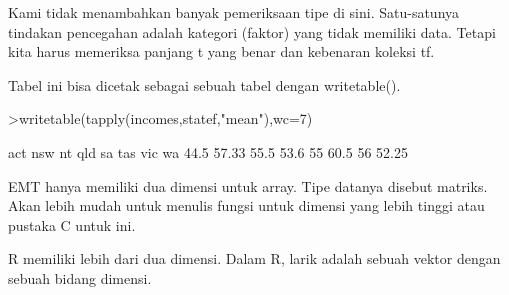 \documentclass[a4paper,10pt]{article}
\begin{document}
\begin{eulernotebook}
\begin{eulercomment}
\begin{eulercomment}
\begin{eulercomment}
\begin{eulercomment}
\begin{eulercomment}
\begin{eulercomment}
\begin{eulercomment}
\begin{eulercomment}
\begin{eulercomment}
\begin{eulercomment}
\begin{eulercomment}
\begin{eulercomment}
\begin{eulercomment}
\begin{eulercomment}
\begin{eulercomment}
\begin{eulercomment}
\begin{eulercomment}
\begin{eulercomment}
\begin{eulercomment}
\begin{eulercomment}
\begin{eulercomment}
\begin{eulercomment}
\begin{eulercomment}
Kami tidak menambahkan banyak pemeriksaan tipe di sini. Satu-satunya
tindakan pencegahan adalah kategori (faktor) yang tidak memiliki data.
Tetapi kita harus memeriksa panjang t yang benar dan kebenaran koleksi
tf.

Tabel ini bisa dicetak sebagai sebuah tabel dengan writetable().
\end{eulercomment}
\begin{eulerprompt}
>writetable(tapply(incomes,statef,"mean"),wc=7)
\end{eulerprompt}
\begin{euleroutput}
      act    nsw     nt    qld     sa    tas    vic     wa
     44.5  57.33   55.5   53.6     55   60.5     56  52.25
\end{euleroutput}
\begin{eulercomment}
EMT hanya memiliki dua dimensi untuk array. Tipe datanya disebut
matriks. Akan lebih mudah untuk menulis fungsi untuk dimensi yang
lebih tinggi atau pustaka C untuk ini.

R memiliki lebih dari dua dimensi. Dalam R, larik adalah sebuah vektor
dengan sebuah bidang dimensi.


\end{eulercomment}
\end{eulercomment}
\end{eulercomment}
\end{eulercomment}
\end{eulercomment}
\end{eulercomment}
\end{eulercomment}
\end{eulercomment}
\end{eulercomment}
\end{eulercomment}
\end{eulercomment}
\end{eulercomment}
\end{eulercomment}
\end{eulercomment}
\end{eulercomment}
\end{eulercomment}
\end{eulercomment}
\end{eulercomment}
\end{eulercomment}
\end{eulercomment}
\end{eulercomment}
\end{eulercomment}
\end{eulercomment}
\end{eulernotebook}
\end{document}
